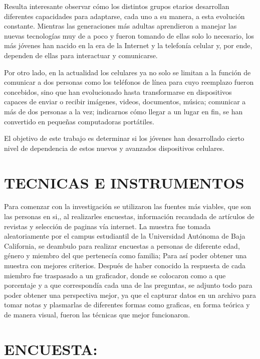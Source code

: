 \documentclass[10pt,a4paper]{article}
\begin{document}
Resulta interesante observar c{\'o}mo los distintos grupos etarios desarrollan diferentes capacidades para adaptarse, cada uno a su manera, a esta evoluci{\'o}n constante.
 Mientras las generaciones m{\'a}s adultas aprendieron a manejar las nuevas tecnolog{\'i}as muy de a poco y fueron tomando de ellas solo lo necesario, los m{\'a}s j{\'o}venes han nacido en la era de la Internet y la telefon{\'i}a celular y, por ende, dependen de ellas para interactuar y comunicarse.

 Por otro lado, en la actualidad los celulares ya no solo se limitan a la funci{\'o}n de comunicar a dos personas como los tel{\'e}fonos de l{\'i}nea para cuyo reemplazo fueron concebidos, sino que han evolucionado hasta transformarse en dispositivos capaces de enviar o recibir im{\'a}genes, videos, documentos, m{\'u}sica; comunicar a m{\'a}s de dos personas a la vez; indicarnos c{\'o}mo llegar a un lugar en fin, se han convertido en peque{\~n}as computadoras port{\'a}tiles.

 El objetivo de este trabajo es determinar si los j{\'o}venes han desarrollado cierto nivel de dependencia de estos nuevos y avanzados dispositivos celulares.

	
	\section{TECNICAS E INSTRUMENTOS}
	
	
Para comenzar con la investigaci{\'o}n se utilizaron las fuentes m{\'a}s viables, que son las personas en si,, al realizarles encuestas, informaci{\'o}n recaudada de art{\'i}culos de revistas y selecci{\'o}n de paginas v{\'i}a internet. 
La muestra fue tomada aleatoriamente por el campus estudiantil de la Universidad Aut{\'o}noma de Baja California, se deambulo para realizar encuestas a personas de diferente edad, g{\'e}nero y miembro del que pertenec{\'i}a como familia; Para as{\'i} poder obtener una muestra con mejores criterios. Despu{\'e}s de haber conocido la respuesta de cada miembro fue traspasado a un graficador, donde se colocaron como a que porcentaje y a que correspond{\'i}a cada una de las preguntas, se adjunto todo para poder obtener una perspectiva mejor, ya que el capturar datos en un archivo para tomar notas y plasmarlas de diferentes formas como graficas, en forma te{\'o}rica y de manera visual, fueron las t{\'e}cnicas que mejor funcionaron. 

	
	
	
	\section{ENCUESTA:}
	
\end{document}
